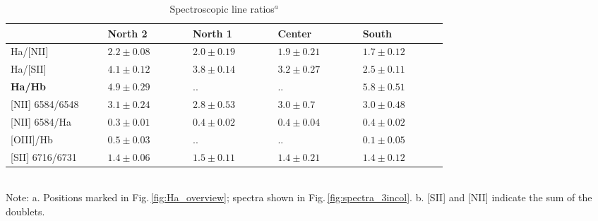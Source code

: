 \documentclass{aa}
\begin{document}
\begin{table}[ht]
{\small %
  \caption{Spectroscopic line ratios$^a$} 
  \label{tab:spectral_line_ratios}
\centering
\begin{tabular}{p{0.16\linewidth}p{0.14\linewidth}p{0.14\linewidth}p{0.14\linewidth}p{0.14\linewidth}}
\toprule
                        & North 2 & North 1 & Center & South \\
\midrule
Ha/[NII]        &  $2.2\pm0.08$ &  $2.0\pm0.19$ &  $1.9\pm0.21$ &  $1.7\pm0.12$ \\

Ha/[SII]        &  $4.1\pm0.12$ &  $3.8\pm0.14$ &  $3.2\pm0.27$ &  $2.5\pm0.11$ \\

\textbf{Ha/Hb}           &  $4.9\pm0.29$ &     $..$      &     $..$      &  $5.8\pm0.51$ \\

[NII] 6584/6548 &  $3.1\pm0.24$ &  $2.8\pm0.53$ &   $3.0\pm0.7$ &  $3.0\pm0.48$ \\

[NII] 6584/Ha   &  $0.3\pm0.01$ &  $0.4\pm0.02$ &  $0.4\pm0.04$ &  $0.4\pm0.02$ \\

[OIII]/Hb       &  $0.5\pm0.03$ &     $..$      &     $..$      &  $0.1\pm0.05$ \\

[SII] 6716/6731 &  $1.4\pm0.06$ &  $1.5\pm0.11$ &  $1.4\pm0.21$ &  $1.4\pm0.12$ \\

\bottomrule
\end{tabular}
\\
Note: a. Positions marked in Fig.\,\ref{fig:Ha_overview};
spectra shown in Fig.\,\ref{fig:spectra_3incol}.
b. [SII] and [NII] indicate the sum of the doublets.
} %
\end{table}
\end{document}
